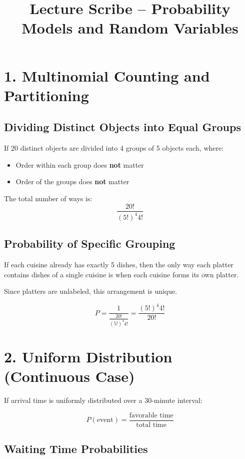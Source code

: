 \documentclass[12pt]{article}
\title{Lecture Scribe -- Probability Models and Random Variables}
\author{}
\date{}
\begin{document}
\maketitle

\section*{1. Multinomial Counting and Partitioning}

\subsection*{Dividing Distinct Objects into Equal Groups}

If 20 distinct objects are divided into 4 groups of 5 objects each, where:
\begin{itemize}
    \item Order within each group does \textbf{not} matter
    \item Order of the groups does \textbf{not} matter
\end{itemize}

The total number of ways is:
\[
\frac{20!}{(5!)^4 4!}
\]

\subsection*{Probability of Specific Grouping}

If each cuisine already has exactly 5 dishes, then the only way each platter contains dishes of a single cuisine is when each cuisine forms its own platter.

Since platters are unlabeled, this arrangement is unique.

\[
P = \frac{1}{\frac{20!}{(5!)^4 4!}} 
= \frac{(5!)^4 4!}{20!}
\]

\section*{2. Uniform Distribution (Continuous Case)}

If arrival time is uniformly distributed over a 30-minute interval:

\[
P(\text{event}) = \frac{\text{favorable time}}{\text{total time}}
\]

\subsection*{Waiting Time Probabilities}
\end{document}
